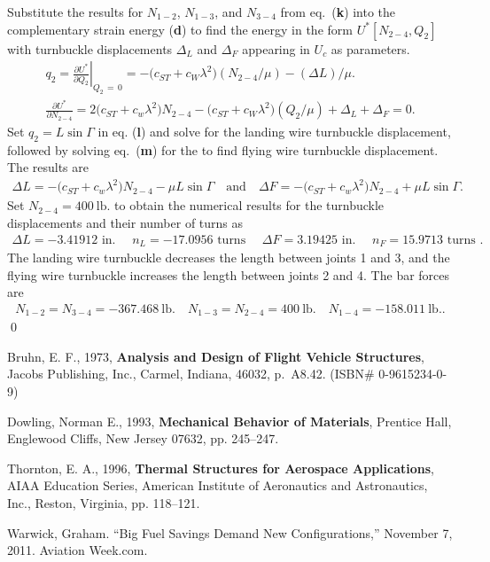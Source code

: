 \documentclass{AeroStructure-ERJohnson}
\begin{document}
\begin{example*}
Substitute the results for $N_{1-2}$, $N_{1-3}$, and $N_{3-4}$ from eq.~(\textbf{k}) into the complementary strain energy (\textbf{d}) to find the energy in the form $U^{*}\left[N_{2-4}, Q_{2}\right]$ with turnbuckle displacements $\Delta_L$ and $\Delta_F$ appearing in $U_c$ as parameters.
\begin{gather}
q_{2}=\left.\frac{\partial U^{*}}{\partial Q_{2}}\right|_{Q_{2}\,=\,0}=-\big(c_{S T}+c_{W} \lambda^{2}\big)\left(N_{2-4} / \mu\right)-(\Delta L) / \mu.\\
\frac{\partial U^{*}}{\partial N_{2-4}}=2\big(c_{S T}+c_{w} \lambda^{2}\big) N_{2-4}-\big(c_{S T}+c_{W} \lambda^{2}\big)\left(Q_{2} / \mu\right)+\Delta_{L}+\Delta_{F}=0.
\end{gather}
Set $q_{2}=L \sin \Gamma$ in eq. (\textbf{l}) and solve for the landing wire turnbuckle displacement, followed by solving eq.~(\textbf{m}) for the to find flying wire turnbuckle displacement. The results are
\begin{align}
\Delta L=-\big(c_{S T}+c_{w} \lambda^{2}\big) N_{2-4}-\mu L \sin \Gamma\quad \text{and}\quad \Delta F=-\big(c_{S T}+c_{w} \lambda^{2}\big) N_{2-4}+\mu L \sin \Gamma.
\end{align}
Set $N_{2-4}=400~\mathrm{lb.}$ to obtain the numerical results for the turnbuckle displacements and their number of turns as
\begin{align}
\Delta L=-3.41912 \text { in. } \quad n_{L}=-17.0956 \text { turns } \quad \Delta F=3.19425 \text { in. } \quad n_{F}=15.9713 \text { turns }.
\end{align}
The landing wire turnbuckle decreases the length between joints 1 and 3, and the flying wire turnbuckle increases the length between joints 2 and 4. The bar forces are
\begin{align}
N_{1-2}=N_{3-4}=-367.468~\mathrm{lb} . \quad N_{1-3}=N_{2-4}=400~\mathrm{lb} . \quad N_{1-4}=-158.011~\mathrm{lb.}. \end{align}\hfill\qed
\end{example*}

\vspace*{-1.6pc}

\def\rightmark{Practice exercises}

\begin{thebibliography}{}\label{sec6.5}

\bibitem{}
Bruhn, E. F., 1973, \textbf{Analysis and Design of Flight Vehicle Structures}, Jacobs Publishing, Inc., Carmel, Indiana, 46032, p.~A8.42. (ISBN\# 0-9615234-0-9)

\bibitem{}
Dowling, Norman E., 1993, \textbf{Mechanical Behavior of Materials}, Prentice Hall, Englewood Cliffs, New Jersey 07632, pp. 245--247.

\bibitem{}
Thornton, E. A., 1996, \textbf{Thermal Structures for Aerospace Applications}, AIAA Education Series, American Institute of Aeronautics and Astronautics, Inc., Reston, Virginia, pp. 118--121.

\bibitem{}
Warwick, Graham. ``Big Fuel Savings Demand New Configurations,'' November 7, 2011. Aviation Week.com.
\end{thebibliography}
\end{document}

